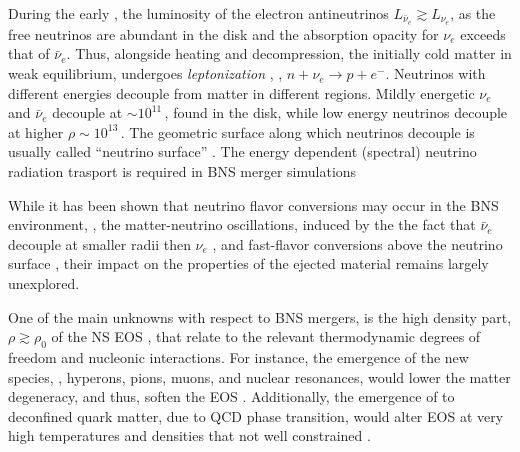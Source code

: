 During the early \pmerg{}, the luminosity of the electron antineutrinos 
$L_{\bar{\nu}_e}{\gtrsim}L_{\nu_e}$, as the 
free neutrinos are abundant in the disk and the absorption opacity for $\nu_e$ 
exceeds that of $\bar{\nu}_e$.
Thus, alongside heating and decompression, the initially cold matter in weak 
equilibrium, undergoes \textit{leptonization} 
\citep{Perego:2014fma,Endrizzi:2019trv},
\ie, $n+\nu_e\rightarrow p + e^-$. 
%
Neutrinos with different energies decouple from matter in different regions.
Mildly energetic $\nu_{e}$ and $\bar{\nu}_e$ decouple at ${\sim}10^{11}\,$\gcm, found 
in the disk, while low energy neutrinos decouple at higher $\rho\sim10^{13}\,$\gcm.
The geometric surface along which neutrinos decouple is usually called ``neutrino 
surface'' \citep{Perego:2014fma,Endrizzi:2019trv}.
The energy dependent (spectral) neutrino radiation trasport is required in 
\ac{BNS} merger simulations

While it has been shown that neutrino flavor conversions may occur in the \ac{BNS} 
\pmerg{} environment, \eg, the matter-neutrino oscillations, induced by the 
the fact that $\bar{\nu}_e$ decouple at smaller radii then $\nu_{e}$ 
\citep[\eg][]{Zhu:2016mwa,Tian:2017xbr}, and fast-flavor conversions above the 
neutrino surface \citep{Wu:2017drk}, their impact on the properties of the ejected 
material remains largely unexplored.

One of the main unknowns with respect to \ac{BNS} mergers, is the high density part, 
$\rho{\gtrsim}\rho_0$ of the \ac{NS} \ac{EOS} \citep[\eg][]{Hebeler:2013nza,Oertel:2016bki}, that relate to the 
relevant thermodynamic degrees of freedom and nucleonic interactions. For instance, 
the emergence of the new species, \eg, hyperons, pions, muons, and nuclear 
resonances, would lower the matter degeneracy, and thus, soften the \ac{EOS} \citep[\eg][]{Fore:2019wib,Vidana:2010ip}.
Additionally, the emergence of to deconfined quark matter, due to \ac{QCD} phase transition,
would alter \ac{EOS} at very high temperatures and densities that not well constrained 
\cite{Busza:2018rrf}.

